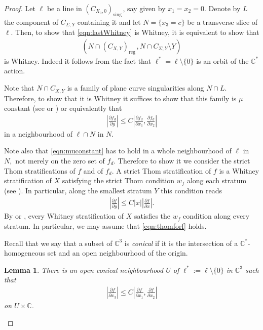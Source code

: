\documentclass[12pt]{amsart}
\newtheorem{lemma}[theorem]{Lemma}
\theoremstyle{definition}
\numberwithin{equation}{section}
\newcommand{\C}{\mathbb{C}}
\DeclareMathOperator{\sing}{sing \, }
\DeclareMathOperator{\reg}{reg\,}
\begin{document}
\begin{proof}
Let $\ell$  be a line in $(C_{X_0,0})_{\sing}$,  say given by $x_1=x_2=0$.
Denote by $L$ the component of $C_{\Sigma,Y}$  containing it and
let $N=\{x_3=c\}$  be a transverse slice of $\ell$.  Then,  to show that  \eqref{eqn:lastWhitney}
 is Whitney, it is equivalent to show that 
 \begin{align}\label{eqn:lastWhitneyslice}
(N\cap (C_{X,Y})_{\reg}, N\cap C_{\Sigma,Y} \setminus Y)
\end{align} 
is Whitney. Indeed it follows from the fact that $\ell^* = \ell \setminus \{0\}$ is an orbit of the $\C^*$ action.  

Note that $N\cap C_{X,Y}$  is a family of plane
curve singularities along $N\cap L$.  Therefore, to show that it
is Whitney it suffices to show that this family is $\mu$  constant (see \cite{LeRa76} or \cite{Te76})  
or equivalently that 
 \begin{align}\label{eqn:muconstant}
\left |\frac{\partial f_d}{\partial y} \right| \leq C \left| \frac{\partial f_d}{\partial x_1} , \frac{\partial f_d}{\partial x_2} \right|
\end{align} 
in a neighbourhood of $\ell\cap N$ in $N$.

Note also that \eqref{eqn:muconstant} has to hold in a whole neighbourhood of $\ell$ 
in $N,$ not merely on the zero set of $f_d$. Therefore to show it we consider the strict Thom stratifications of $f$ and of $f_d$.  A strict Thom stratification of $f$ is a Whitney stratification of $X$ satisfying the strict Thom condition $w_f$ along each stratum (see \cite{HMS84}).  In particular, along the smallest stratum $Y$ this condition reads
\begin{align}\label{eqn:thomforf}
\left |\frac{\partial f}{\partial y}\right |\leq C|x|\left|\frac{\partial f}{\partial x}\right|.
\end{align}
By \cite{Pa93} or \cite{BMM94}, every Whitney stratification of $X$ satisfies the $w_f$ condition along every stratum.  In particular, we may assume that  \eqref{eqn:thomforf} holds. 

Recall that we say that a subset of $\C^3$ is \emph{conical} if it is the intersection of a $\C^*$-homogeneous set and an open neighbourhood of the origin.  

\begin{lemma}\label{lem:localinequality}
There is an open conical neighbourhood $U$ of $\ell^*:= \ell\setminus \{0\}$ in $\C^3$  such that 
\begin{align}\label{eqn:prepa}
\left|\frac{\partial f}{\partial x_3}\right|\leq C \left|\frac{\partial f}{\partial x_1}, \frac{\partial f}{\partial x_2} \right| 
\end{align}
on $U\times \C $.  
\end{lemma} 


\end{proof}
\end{document}
